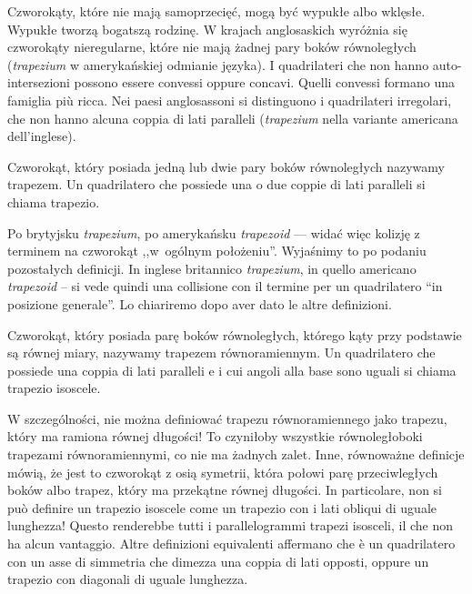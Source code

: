 Czworokąty, które nie mają samoprzecięć, mogą być wypukłe albo wklęsłe. %
Wypukłe tworzą bogatszą rodzinę. %
W krajach anglosaskich wyróżnia się czworokąty nieregularne, które nie mają żadnej pary boków równoległych (\emph{trapezium} w amerykańskiej odmianie języka). %
I quadrilateri che non hanno auto-intersezioni possono essere convessi oppure concavi. %
Quelli convessi formano una famiglia più ricca. %
Nei paesi anglosassoni si distinguono i quadrilateri irregolari, che non hanno alcuna coppia di lati paralleli (\emph{trapezium} nella variante americana dell’inglese). %

\begin{definition}
[trapez] %
[trapezio] %
Czworokąt, który posiada jedną lub dwie pary boków równoległych nazywamy trapezem. %
Un quadrilatero che possiede una o due coppie di lati paralleli si chiama trapezio. %
\end{definition}

Po brytyjsku \emph{trapezium}, po amerykańsku \emph{trapezoid} --- widać więc kolizję z terminem na czworokąt ,,w~ogólnym położeniu''.%
Wyjaśnimy to po podaniu pozostałych definicji. %
In inglese britannico \emph{trapezium}, in quello americano \emph{trapezoid} -- si vede quindi una collisione con il termine per un quadrilatero ``in posizione generale''. %
Lo chiariremo dopo aver dato le altre definizioni. %

\begin{definition}
[trapez równoramienny] %
[trapezio isoscele] %
Czworokąt, który posiada parę boków równoległych, którego kąty przy podstawie są równej miary, nazywamy trapezem równoramiennym. %
Un quadrilatero che possiede una coppia di lati paralleli e i cui angoli alla base sono uguali si chiama trapezio isoscele. %
\end{definition}

W szczególności, nie można definiować trapezu równoramiennego jako trapezu, który ma ramiona równej długości! %
To czyniłoby wszystkie równoległoboki trapezami równoramiennymi, co nie ma żadnych zalet. %
Inne, równoważne definicje mówią, że jest to czworokąt z osią symetrii, która połowi parę przeciwległych boków albo trapez, który ma przekątne równej długości. %
In particolare, non si può definire un trapezio isoscele come un trapezio con i lati obliqui di uguale lunghezza! %
Questo renderebbe tutti i parallelogrammi trapezi isosceli, il che non ha alcun vantaggio. %
Altre definizioni equivalenti affermano che è un quadrilatero con un asse di simmetria che dimezza una coppia di lati opposti, oppure un trapezio con diagonali di uguale lunghezza. %

